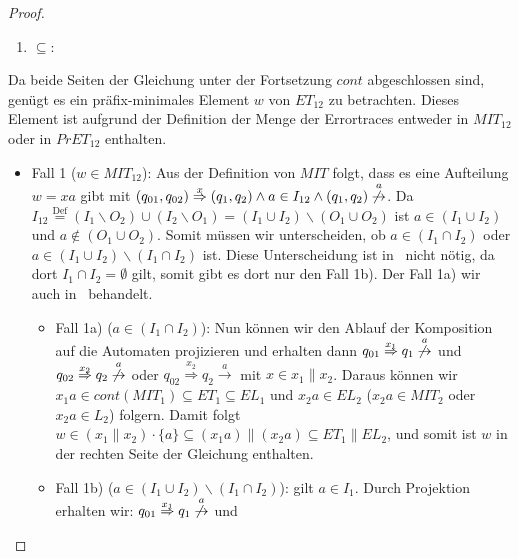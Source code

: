 \begin{proof}
  ~
  \begin{enumerate}
    \item \glqq $\subseteq$\grqq :
  \end{enumerate}
  Da beide Seiten der Gleichung unter der Fortsetzung $cont$ abgeschlossen sind, genügt es ein
  präfix-minimales Element $w$ von $ET_{12}$ zu betrachten. Dieses Element ist
  aufgrund der Definition der Menge der Errortraces entweder in $MIT_{12}$ oder in
  $PrET_{12}$ enthalten.\\
  \begin{itemize}
    \item Fall 1 ($w\in MIT_{12}$): Aus der Definition von $MIT$ folgt, dass es eine
  Aufteilung $w=xa$ gibt mit
  $(q_{01},q_{02})\overset{x}{\Rightarrow}(q_1,q_2)\wedge a\in I_{12}\wedge
  (q_1,q_2)\overset{a}{\not{\hspace{-0.1cm}\rightarrow}}$. Da
  $I_{12}\overset{\mathrm{Def}}{=}(I_1\backslash O_2)\cup (I_2\backslash O_1)=(I_1\cup
  I_2)\backslash (O_1\cup O_2)$ ist $a\in (I_1\cup I_2)$ und $a\notin (O_1\cup
  O_2)$. Somit müssen wir unterscheiden, ob $a\in (I_1\cap I_2)$ oder $a\in
  (I_1\cup I_2)\backslash (I_1\cap I_2)$ ist. Diese Unterscheidung ist
  in~\cite{Vogler2014EIO} nicht nötig, da dort $I_1\cap I_2=\emptyset$ gilt,
  somit gibt es dort nur den Fall 1b). Der Fall 1a) wir auch
  in~\cite{Schlosser2012BA} behandelt.
  \begin{itemize}
    \item Fall 1a) ($a\in (I_1\cap I_2)$): Nun können wir den Ablauf der
      Komposition auf die Automaten projizieren und erhalten dann \oBdA{}
      $q_{01}\overset{x_1}{\Rightarrow} q_1
      \overset{a}{\not{\hspace{-0.1cm}\rightarrow}}$ und
      $q_{02}\overset{x_2}{\Rightarrow} q_2
      \overset{a}{\not{\hspace{-0.1cm}\rightarrow}}$ oder
      $q_{02}\overset{x_2}{\Rightarrow} q_2 \overset{a}{\rightarrow}$ mit $x\in
      x_1\|x_2$. Daraus können wir $x_1a\in cont(MIT_1)\subseteq ET_1\subseteq
      EL_1$ und $x_2a\in EL_2$ ($x_2a\in MIT_2$ oder $x_2a\in L_2$) folgern. Damit folgt $w\in
      (x_1\|x_2)\cdot\{a\}\subseteq (x_1a)\|(x_2a)\subseteq ET_1\|EL_2$, und
      somit ist $w$ in der rechten Seite der Gleichung enthalten.
  \item Fall 1b) ($a\in (I_1\cup I_2)\backslash(I_1\cap I_2)$): \OBdA{} gilt
      $a\in I_1$. Durch Projektion erhalten wir:
      $q_{01}\overset{x_1}{\Rightarrow} q_1
      \overset{a}{\not{\hspace{-0.1cm}\rightarrow}}$ und

\end{itemize}
\end{itemize}
\end{proof}
